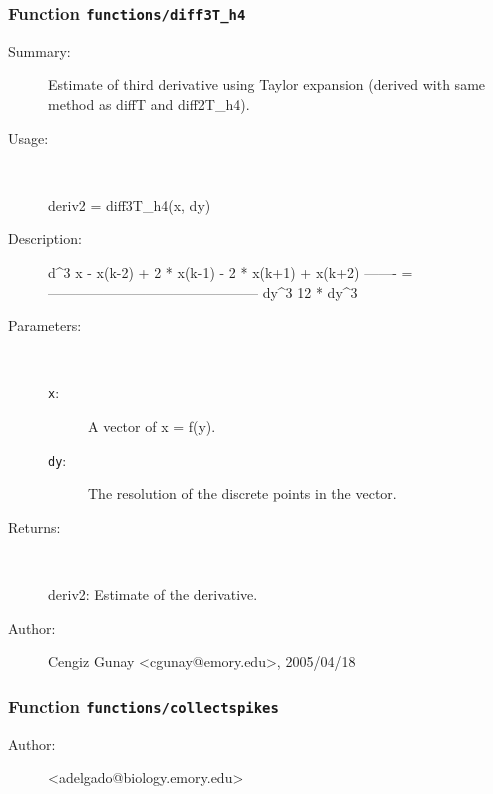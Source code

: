 \subsubsection[Function \texttt{diff3T\_h4}]{Function \texttt{functions/diff3T\_h4}}%
%
\label{ref_functions__diff3T_h4}%
\hypertarget{ref_functions__diff3T_h4}{}%
\begin{description}
\item[Summary:]Estimate of third derivative using Taylor expansion (derived with same method as diffT and diff2T\_h4).
%
\item[Usage:]~%
\begin{lyxcode}%
deriv2 = diff3T\_h4(x, dy)
%
\end{lyxcode}%
%
\item[Description:]%
d\textasciicircum{}3 x     - x(k-2) + 2 * x(k-1) - 2 * x(k+1) + x(k+2)
  ------- = ---------------------------------------------
   dy\textasciicircum{}3			12 * dy\textasciicircum{}3
\item[Parameters:]~
\begin{description}%
\item[\texttt{x}:]
 A vector of x = f(y).
\item[\texttt{dy}:]
 The resolution of the discrete points in the vector.
\end{description}%
%
\item[Returns:]~

 	deriv2: Estimate of the derivative.
%
%
%
\item[Author:]%
Cengiz Gunay <cgunay@emory.edu>, 2005/04/18%
\end{description}
\methodline%
\subsubsection[Function \texttt{collectspikes}]{Function \texttt{functions/collectspikes}}%
%
\label{ref_functions__collectspikes}%
\hypertarget{ref_functions__collectspikes}{}%
\begin{description}
%
%
%
%
%
%
%
\item[Author:]%
<adelgado@biology.emory.edu>%
\end{description}
\methodline%
